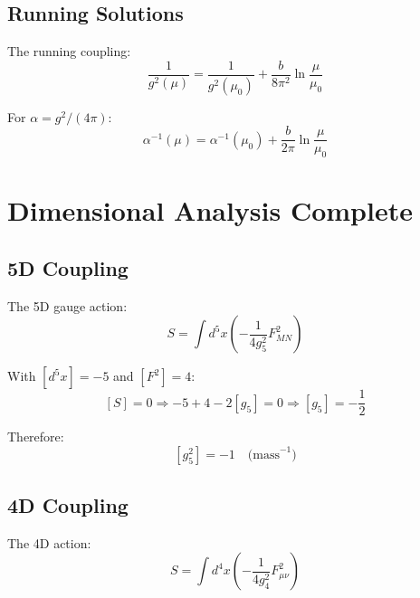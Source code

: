 \documentclass[11pt,a4paper]{article}
\begin{document}
\subsection{Running Solutions}
\label{app:running-solutions}

The running coupling:
\begin{equation}
\label{eq:g-running}
\frac{1}{g^2(\mu)} = \frac{1}{g^2(\mu_0)} + \frac{b}{8\pi^2} \ln\frac{\mu}{\mu_0}
\end{equation}

For $\alpha = g^2/(4\pi)$:
\begin{equation}
\label{eq:alpha-running}
\alpha^{-1}(\mu) = \alpha^{-1}(\mu_0) + \frac{b}{2\pi} \ln\frac{\mu}{\mu_0}
\end{equation}

\section{Dimensional Analysis Complete}
\label{app:dim-analysis}

\subsection{5D Coupling}
\label{app:5d-coupling-dim}

The 5D gauge action:
\begin{equation}
\label{eq:5d-action-dim}
S = \int d^5x \left(-\frac{1}{4g_5^2} F_{MN}^2\right)
\end{equation}

With $[d^5x] = -5$ and $[F^2] = 4$:
\begin{equation}
\label{eq:g5-dim-derive}
[S] = 0 \Rightarrow -5 + 4 - 2[g_5] = 0 \Rightarrow [g_5] = -\frac{1}{2}
\end{equation}

Therefore:
\begin{equation}
\label{eq:g5-sq-dim}
[g_5^2] = -1 \quad \text{(mass}^{-1}\text{)}
\end{equation}

\subsection{4D Coupling}
\label{app:4d-coupling-dim}

The 4D action:
\begin{equation}
\label{eq:4d-action-dim}
S = \int d^4x \left(-\frac{1}{4g_4^2} F_{\mu\nu}^2\right)
\end{equation}
\end{document}
